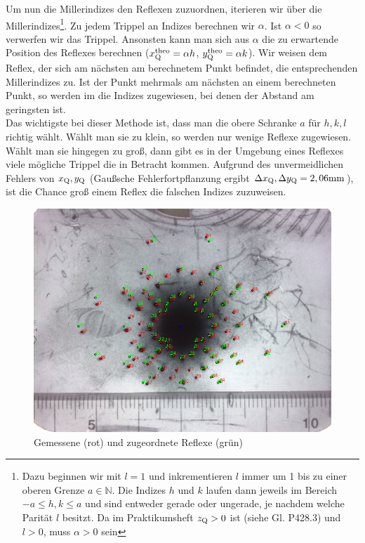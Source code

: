 Um nun die Millerindizes den Reflexen zuzuordnen, iterieren wir über die Millerindizes\footnote{Dazu beginnen wir mit $l=1$ und inkrementieren $l$ immer um 1 bis zu einer oberen Grenze $a \in \mathbb{N}$. Die Indizes $h$ und $k$ laufen dann jeweils im Bereich $-a \leq h,k \leq a$ und sind entweder gerade oder ungerade, je nachdem welche Parität $l$ besitzt. Da im  Praktikumsheft $z\ind{Q} > 0$ ist (siehe Gl. P428.3) und $l > 0$, muss $\alpha > 0$ sein}. Zu jedem Trippel an Indizes berechnen wir $\alpha$. Ist $\alpha < 0$ so verwerfen wir das Trippel. Ansonsten kann man sich aus $\alpha$ die zu erwartende Position des Reflexes berechnen ($x\ind{Q}\upd{theo} = \alpha h$, $y\ind{Q}\upd{theo} = \alpha k$). Wir weisen dem Reflex, der sich am nächsten am berechnetem Punkt befindet, die entsprechenden Millerindizes zu. Ist der Punkt mehrmals am nächsten an einem berechneten Punkt, so werden im die Indizes zugewiesen, bei denen der Abstand am geringsten ist.\\

Das wichtigste bei dieser Methode ist, dass man die obere Schranke $a$ für $h,k,l$ richtig wählt. Wählt man sie zu klein, so werden nur wenige Reflexe zugewiesen. Wählt man sie hingegen zu groß, dann gibt es in der Umgebung eines Reflexes viele mögliche Trippel die in Betracht kommen. Aufgrund des unvermeidlichen Fehlers von $x\ind{Q}, y\ind{Q}$ (Gaußsche Fehlerfortpflanzung ergibt $\Delta x\ind{Q}, \Delta y\ind{Q} = \si{2,06 \milli\meter}$), ist die Chance groß einem Reflex die falschen Indizes zuzuweisen.

\begin{figure}
\centering
\includegraphics[scale=0.6]{data/laue/draw/laue.png}
\caption{Gemessene (rot) und zugeordnete Reflexe (grün)}
\label{fig:laue_calc}
\end{figure}

